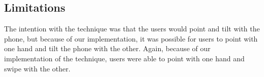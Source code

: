 \subsection{Limitations}

The intention with the \tilt technique was that the users would point and tilt with the phone, but because of our implementation, it was possible for users to point with one hand and tilt the phone with the other.
Again, because of our implementation of the \swipe technique, users were able to point with one hand and swipe with the other.